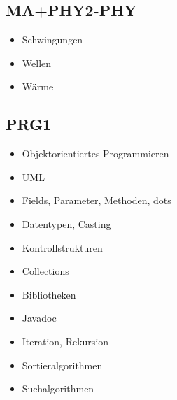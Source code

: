 \subsection{MA+PHY2-PHY}
\begin{itemize}
  \item Schwingungen
  \item Wellen
  \item Wärme
\end{itemize}

\subsection{PRG1}
\begin{itemize}
  \item Objektorientiertes Programmieren
  \item UML
  \item Fields, Parameter, Methoden, dots
  \item Datentypen, Casting
  \item Kontrollstrukturen
  \item Collections
  \item Bibliotheken
  \item Javadoc
  \item Iteration, Rekursion
  \item Sortieralgorithmen
  \item Suchalgorithmen
\end{itemize}

